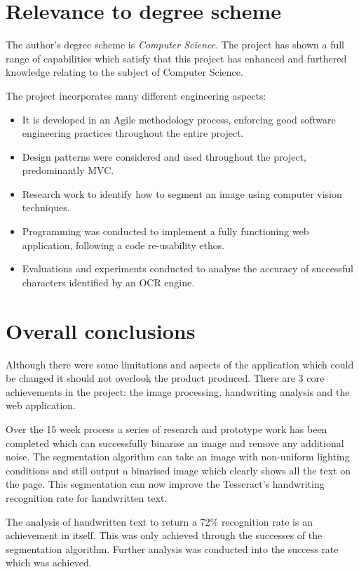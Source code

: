 \section{Relevance to degree scheme}
The author's degree scheme is \textit{Computer Science}. The project has shown a full range of capabilities which satisfy that this project has enhanced and furthered knowledge relating to the subject of Computer Science.

The project incorporates many different engineering aspects:
\begin{itemize}
	\item It is developed in an Agile methodology process, enforcing good software engineering practices throughout the entire project.
	\item Design patterns were considered and used throughout the project, predominantly MVC.
	\item Research work to identify how to segment an image using computer vision techniques.
	\item Programming was conducted to implement a fully functioning web application, following a code re-usability ethos.
	\item Evaluations and experiments conducted to analyse the accuracy of successful characters identified by an OCR engine.
\end{itemize}

\section{Overall conclusions}
Although there were some limitations and aspects of the application which could be changed it should not overlook the product produced. There are 3 core achievements in the project: the image processing, handwriting analysis and the web application.

Over the 15 week process a series of research and prototype work has been completed which can successfully binarise an image and remove any additional noise. The segmentation algorithm can take an image with non-uniform lighting conditions and still output a binarised image which clearly shows all the text on the page. This segmentation can now improve the Tesseract's handwriting recognition rate for handwritten text.

The analysis of handwritten text to return a 72\% recognition rate is an achievement in itself. This was only achieved through the successes of the segmentation algorithm. Further analysis was conducted into the success rate which was achieved.

